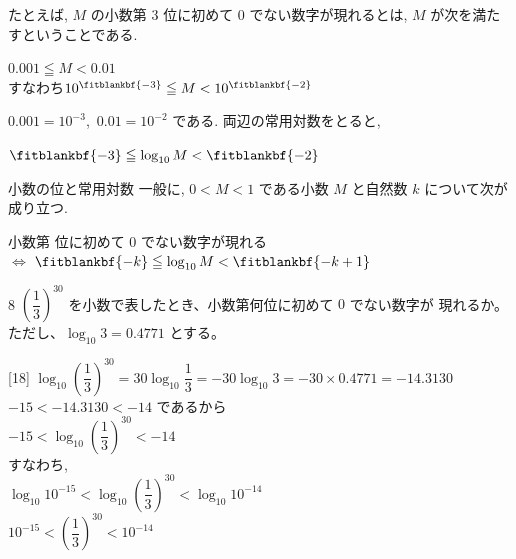 \documentclass[14pt,dvipdfmx]{jsarticle}
\begin{document}
\vspace{0.08em}
たとえば, $M$ の小数第 $3$ 位に初めて $0$ でない数字が現れるとは,
$M$ が次を満たすということである.
\par\vspace{0.06em}
{\centering
$0.001 \leqq M < 0.01$\\[0.3em]
すなわち\qquad $10^{\fitblankbf{-3}} \leqq M < 10^{\fitblankbf{-2}}$
\par}
\vspace{0.06em}
$0.001 = 10^{-3}$,\ $0.01 = 10^{-2}$ である.
両辺の常用対数をとると,
\par\vspace{0.04em}
{\centering
$\fitblankbf{-3} \leqq \log_{10} M < \fitblankbf{-2}$
\par}

\vspace{5em}
\begin{theorembox}{小数の位と常用対数}
  一般に, $0 < M < 1$ である小数 $M$ と自然数 $k$ について次が成り立つ.
  \par\vspace{0.1em}
  {\centering
  小数第  位に初めて $0$ でない数字が現れる\\[0.3em]
  $\Longleftrightarrow$\qquad
  $\fitblankbf{-k} \leqq \log_{10} M < \fitblankbf{-k+1}$
  \par}
\end{theorembox}

\vfill
\nextpage

\vspace{-1.2zw}
\begin{exampleprob}{8}
  $\left(\dfrac{1}{3}\right)^{30}$ を小数で表したとき、小数第何位に初めて $0$ でない数字が
  現れるか。ただし、$\log_{10} 3 = 0.4771$ とする。
\end{exampleprob}

\begin{answerbox}{}[18]
  $\log_{10}\!\left(\dfrac{1}{3}\right)^{30}
    = 30\log_{10}\dfrac{1}{3}
    = -30\log_{10} 3
    = -30 \times 0.4771 = -14.3130$\\
  $-15 < -14.3130 < -14$ であるから\\
  $-15 < \log_{10}\!\left(\dfrac{1}{3}\right)^{30} < -14$\\
  \vspace{0.45em}
  すなわち,\\
  \vspace{0.45em}
  $\log_{10} 10^{-15} < \log_{10}\!\left(\dfrac{1}{3}\right)^{30} < \log_{10} 10^{-14}$\\
  $10^{-15} < \left(\dfrac{1}{3}\right)^{30} < 10^{-14}$\\
\end{answerbox}
\end{document}
